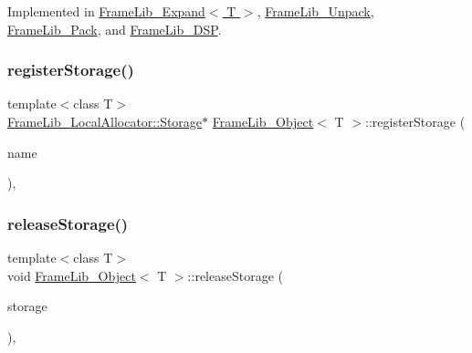 Implemented in \hyperlink{class_frame_lib___expand_a5ab23cdee5ca51ed5098b8a99164aa6a}{Frame\+Lib\+\_\+\+Expand$<$ T $>$}, \hyperlink{class_frame_lib___unpack_aa065a393363c5cc93d7d21dd4b1e6e1a}{Frame\+Lib\+\_\+\+Unpack}, \hyperlink{class_frame_lib___pack_a48e9118d038396653928116b5c69077f}{Frame\+Lib\+\_\+\+Pack}, and \hyperlink{class_frame_lib___d_s_p_a17b4529624dd9219d502570f81d88b27}{Frame\+Lib\+\_\+\+D\+SP}.

\mbox{\label{class_frame_lib___object_a316d15b17757ddfef4341d0f8afe443e}} 
\subsubsection{\texorpdfstring{register\+Storage()}{registerStorage()}}
{\footnotesize\ttfamily template$<$class T$>$ \\
\hyperlink{class_frame_lib___local_allocator_1_1_storage}{Frame\+Lib\+\_\+\+Local\+Allocator\+::\+Storage}$\ast$ \hyperlink{class_frame_lib___object}{Frame\+Lib\+\_\+\+Object}$<$ T $>$\+::register\+Storage (\begin{DoxyParamCaption}\item[{const char $\ast$}]{name }\end{DoxyParamCaption})\hspace{0.3cm}{\ttfamily [inline]}, {\ttfamily [protected]}}

\mbox{\label{class_frame_lib___object_a4c131dff9d634f17696fb3ae6be06e9b}} 
\subsubsection{\texorpdfstring{release\+Storage()}{releaseStorage()}}
{\footnotesize\ttfamily template$<$class T$>$ \\
void \hyperlink{class_frame_lib___object}{Frame\+Lib\+\_\+\+Object}$<$ T $>$\+::release\+Storage (\begin{DoxyParamCaption}\item[{\hyperlink{class_frame_lib___local_allocator_1_1_storage}{Frame\+Lib\+\_\+\+Local\+Allocator\+::\+Storage} $\ast$\&}]{storage }\end{DoxyParamCaption})\hspace{0.3cm}{\ttfamily [inline]}, {\ttfamily [protected]}}

